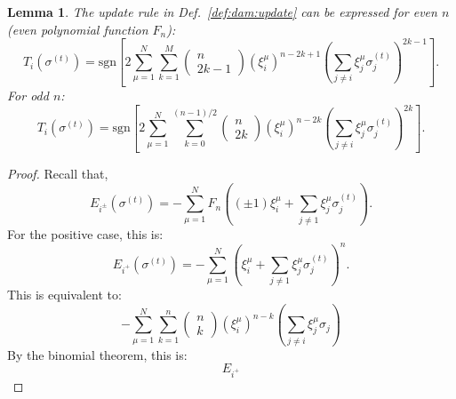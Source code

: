\documentclass{article}
\newtheorem{lemma}{Lemma}
\theoremstyle{definition}
\begin{document}
\begin{lemma}
  The update rule in Def.~\ref{def:dam:update} can be expressed for even $n$
  (even polynomial function $F_n$):
  \begin{equation}
    T_i (\sigma^{(t)}) = \text{sgn} \left[ 2 \sum^N_{\mu=1} \sum^M_{k=1}
     \begin{pmatrix}
      n \\
      2 k - 1
     \end{pmatrix}
     (\xi^\mu_i)^{n - 2k + 1}
     \left(
      \sum_{j \neq i} \xi^\mu_j \sigma^{(t)}_j
     \right)^{2k - 1}
     \right].
  \end{equation}
  For odd $n$:
  \begin{equation}
    T_i (\sigma^{(t)}) = \text{sgn} \left[ 
      2 \sum^N_{\mu = 1} \sum^{(n-1) / 2}_{k=0}
      \begin{pmatrix}
        n \\
        2k
      \end{pmatrix}
      (\xi^\mu_i)^{n - 2k}
      \left(
        \sum_{j\neq i} \xi^\mu_j \sigma^{(t)}_j
      \right)^{2k}
    \right].
  \end{equation}
\end{lemma}

\begin{proof}
  Recall that,
  \begin{equation}
  E_{i^\pm} (\sigma^{(t)}) = - \sum^N_{\mu=1} F_n \left( (\pm 1) \xi^\mu_i + \sum_{j \neq 1} \xi^\mu_j \sigma^{(t)}_j \right).
  \end{equation}
  For the positive case, this is:
  \begin{equation}
  E_{i^+} (\sigma^{(t)}) = - \sum^N_{\mu=1} \left( \xi^\mu_i + \sum_{j \neq 1} \xi^\mu_j \sigma^{(t)}_j \right)^n.
  \end{equation}
  This is equivalent to:
  \begin{equation}
    - \sum^N_{\mu=1} \sum^n_{k=1} \begin{pmatrix}
      n \\ k
    \end{pmatrix}
    (\xi^\mu_i)^{n-k} \left( \sum_{j \neq i} \xi^\mu_j \sigma_j\right)
  \end{equation}
  By the binomial theorem,
  this is:
  \begin{equation}
  E_{i^+}
  \end{equation}
\end{proof}

\printbibliography
\end{document}
